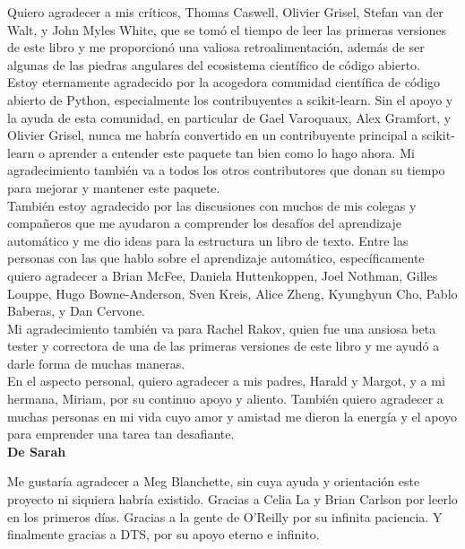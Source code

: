 Quiero agradecer a mis críticos, Thomas Caswell, Olivier Grisel, Stefan van der Walt, y John Myles White, que se tomó el tiempo de leer las primeras versiones de este libro y me proporcionó una valiosa retroalimentación, además de ser algunas de las piedras angulares del ecosistema científico 
de código abierto.\\


Estoy eternamente agradecido por la acogedora comunidad científica de código abierto de Python, 
especialmente los contribuyentes a {\ttfamily scikit-learn}. Sin el apoyo y la ayuda de esta comunidad, 
en particular de Gael Varoquaux, Alex Gramfort, y Olivier Grisel, nunca me habría convertido en un contribuyente principal a {\ttfamily scikit-learn} o aprender a entender  este paquete tan bien como lo hago ahora.   Mi agradecimiento también va a todos los otros contributores que donan su tiempo para mejorar y 
mantener este paquete.\\ 


También estoy agradecido por las discusiones con muchos de mis colegas y compañeros que me ayudaron
a comprender los desafíos del aprendizaje automático y me dio ideas para la estructura un libro de texto. Entre las personas con las que hablo sobre el aprendizaje automático, específicamente quiero agradecer a Brian McFee, Daniela Huttenkoppen, Joel Nothman, Gilles Louppe, Hugo Bowne-Anderson, Sven Kreis, Alice Zheng, Kyunghyun Cho, Pablo Baberas, y Dan Cervone.\\



Mi agradecimiento también va para Rachel Rakov, quien fue una ansiosa beta tester y correctora
de una de las primeras versiones de este libro y me ayudó a darle forma de muchas maneras.\\


En el aspecto personal, quiero agradecer a mis padres, Harald y Margot, y a mi hermana,
Miriam, por su continuo apoyo y aliento. También quiero agradecer a muchas personas en mi 
vida cuyo amor y amistad me dieron la energía y el apoyo para emprender una tarea tan desafiante.\\



{\bf{De Sarah}}


Me gustaría agradecer a Meg Blanchette, sin cuya ayuda y orientación este proyecto
ni siquiera habría existido. Gracias a Celia La y Brian Carlson por leerlo en los primeros días. Gracias a la gente de O'Reilly por su infinita paciencia. Y finalmente gracias a DTS, por su apoyo eterno e infinito.



	
	
	
	
	
	
	\newpage
	
	\setcounter{page}{1}
	\pagestyle{plain}
	
	
	
	
	
	
	
	
	
	\setcounter{secnumdepth}{3}
	
	
	
	\setcounter{tocdepth}{3}
	
	
	
	
	
	
